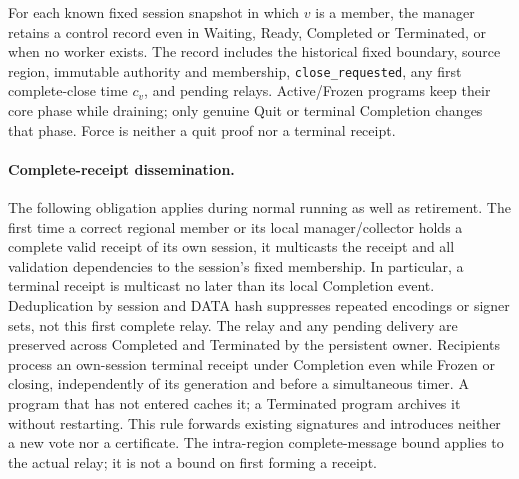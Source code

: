 \documentclass[11pt,a4paper]{article}
\begin{document}
For each known fixed session snapshot in which $v$ is a member, the
manager retains a control record even in Waiting, Ready, Completed or
Terminated, or when no worker exists. The record includes the historical
fixed boundary, source region, immutable authority and membership,
\texttt{close\_requested}, any first complete-close time $c_v$, and
pending relays. Active/Frozen programs keep their core phase while
draining; only genuine Quit or terminal Completion changes that phase.
Force is neither a quit proof nor a terminal receipt.

\paragraph{Complete-receipt dissemination.}
\label{sec:retirement-receipt-relay}
The following obligation applies during normal running as well as
retirement. The first time a correct regional member or its local
manager/collector holds a complete valid receipt of its own session,
it multicasts the receipt and all validation dependencies to the
session's fixed membership. In particular, a terminal receipt is
multicast no later than its local Completion event. Deduplication by
session and DATA hash suppresses repeated encodings or signer sets,
not this first complete relay. The relay and any pending delivery are
preserved across Completed and Terminated by the persistent owner.
Recipients process an own-session terminal receipt under Completion
even while Frozen or closing, independently of its generation and
before a simultaneous timer. A program that has not entered caches
it; a Terminated program archives it without restarting. This rule
forwards existing signatures and introduces neither a new vote nor a
certificate. The intra-region complete-message bound applies to the
actual relay; it is not a bound on first forming a receipt.
\end{document}
